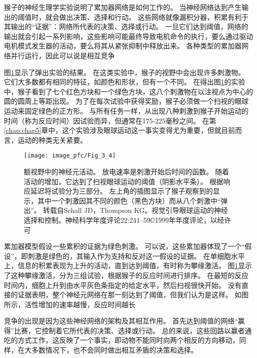 猴子的神经生理学实验说明了累加器网络是如何工作的。
当神经网络达到产生输出的阈值时，就会做出决策、选择和行动。
这些网络就像漏积分器，积累有利于其输出的“证据”：网络所代表的决策、选择或行动。
一旦它们达到阈值，网络的输出就会引起一系列影响，这些影响可能最终导致电机命令的执行，要么通过驱动电机模式发生器的活动，要么将其从紧张抑制中释放出来。
各种类型的累加器网络并行运行，因此可以说是相互竞争\par


图\ref{fig:3_4}显示了弹出实验的结果。
在这类实验中，猴子的视野中会出现许多刺激物。
它们大多数都有相同的特征，如颜色和形状，但有一个不同。
在得出图\ref{fig:3_4}的实验中，猴子看到了七个红色方块和一个绿色方块，这八个刺激物在以注视点为中心的圆的圆周上等距出现。
为了在每次试验中获得奖励，猴子必须做一个扫视的眼球运动来固定绿色的正方形。
与所有任务一样，从出现八种刺激到猴子开始运动的时间（称为反应时间）因试验而异，但通常在175-225毫秒之间。
在第\ref{chap:chap5}章中，这个实验涉及眼球运动这一事实变得尤为重要，但就目前而言，运动的种类无关紧要。\par


\begin{figure}[!htb]
	\centering
	\texttt{[image: image\_pfc/Fig\_3\_4]}
	\caption{额视野中的神经元活动。
		放电速率是刺激开始后时间的函数。
		随着活动的增加，它达到了扫视眼球运动的阈值（阴影水平条）。
		根据响应延迟将试验分为三部分。
		左上角的插图显示了猴子观察到的显示，其中一个刺激因其不同的颜色（黑色方块）而从八个刺激中“弹出”。
		转载自Schall JD，Thompson KG。视觉引导眼球运动的神经选择和控制。神经科学年度评论22:241–59©1999年年度评论，以经许可}
	\label{fig:3_4}
\end{figure}


累加器模型假设一些累积的证据为绿色刺激。
可以说，这些累加器体现了一个“假设”，即刺激是绿色的，其输入作为支持和反对这一假设的证据。
在单细胞水平上，信息的积累表现为上升的活动，直到达到阈值，有时称为攀缘激活。
图\ref{fig:3_4}显示了这种攀缘激活，分为三组试验，根据猴子的反应时间进行排序。
在最短的反应时间内，细胞上升到由水平灰色条指定的给定水平，然后扫视很快开始。
没有直接的证据表明，整个神经元网络在那一刻达到了阈值，但我们认为是这样。
如图所示，活性增加的速率越慢，反应时间越长\par


竞争的出现是因为这些神经网络的架构及其相互作用。
首先达到阈值的网络“赢得”比赛，它控制着它所代表的决策、选择或行动。
总的来说，这些回路以赢者通吃的方式工作，这反映了一个事实，即动物不能同时向两个相反的方向移动，同样，在大多数情况下，也不会同时做出相互矛盾的决策和选择。\par


